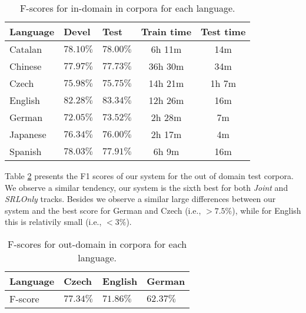 \begin{table}
\begin{center}
\small
\begin{tabular}{|l|l|l|c|c|}\hline
Language           & Devel        & Test       & Train time  & Test time  
\\\hline\hline
Catalan         & $78.10\%$    & $78.00\%$  & 6h 11m  & 14m   \\ %
Chinese         & $77.97\%$    & $77.73\%$  & 36h 30m & 34m   \\ %
Czech           & $75.98\%$    & $75.75\%$  & 14h 21m & 1h 7m \\ %
English         & $82.28\%$    & $83.34\%$  & 12h 26m & 16m   \\ %
German          & $72.05\%$    & $73.52\%$  & 2h 28m  & 7m    \\ %
Japanese        & $76.34\%$    & $76.00\%$  & 2h 17m  & 4m    \\ %
Spanish         & $78.03\%$    & $77.91\%$  & 6h 9m   & 16m   \\ %

\hline
\end{tabular}
\caption{F-scores for in-domain in corpora for each language.}
\label{tbl:results}
\normalsize
\end{center}
\end{table}

Table \ref{tbl:outresults} presents the F1 scores of our system for the out of 
domain test corpora. We observe a similar tendency, our system is the sixth best 
for both \emph{Joint} and \emph{SRLOnly} tracks. Besides we observe a similar 
large differences between our system and the best score for German and Czech 
(i.e., $>7.5\%$), while for English this is relativily small (i.e., $<3\%$). 

\begin{table}
\begin{center}
\small
\begin{tabular}{|l|l|l|l|}\hline
Language        & Czech & English & German\\\hline\hline
F-score           & $77.34\%$ & $71.86\%$ & $62.37\%$  \\
\hline
\end{tabular}
\caption{F-scores for out-domain in corpora for each language.}
\label{tbl:outresults}
\normalsize
\end{center}
\end{table}

